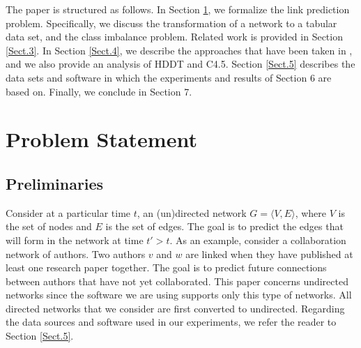 \documentclass{acm_proc_article-sp}
\begin{document}

The paper is structured as follows. In Section \ref{Sect.2}, we formalize the link prediction problem. Specifically, we discuss the transformation of a network to a tabular data set, and the class imbalance problem. Related work is provided in Section \ref{Sect.3}. In Section \ref{Sect.4}, we describe the approaches that have been taken in \cite{Hasan06linkprediction, Lichtenwalter:2010:NPM:1835804.1835837}, and we also provide an analysis of HDDT and C4.5. Section \ref{Sect.5} describes the data sets and software in which the experiments and results of Section 6 are based on. Finally, we conclude in Section 7.  


\section{Problem Statement} 
\label{Sect.2}

\subsection{Preliminaries}

Consider at a particular time $t$, an (un)directed network $G = \langle V,E \rangle$, where $V$ is the set of nodes and $E$ is the set of edges. The goal is to predict the edges that will form in the network at time $t' > t$. As an example, consider a collaboration network of authors. Two authors $v$ and $w$ are linked when they have published at least one research paper together. The goal is to predict future connections between authors that have not yet collaborated. This paper concerns undirected networks since the software we are using supports only this type of networks. All directed networks that we consider are first converted to undirected. Regarding the data sources and software used in our experiments, we refer the reader to Section \ref{Sect.5}.  
\end{document}
